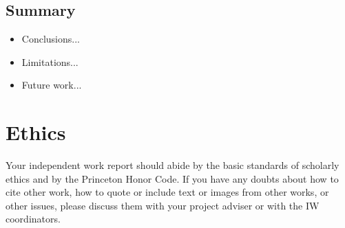 \documentclass[pageno]{jpaper}
\begin{document}
\subsection{Summary}
\begin{itemize}
\item Conclusions...
\item Limitations...
\item Future work...
\end{itemize}


\section{Ethics}

Your independent work report should abide by the basic standards of scholarly ethics and by the Princeton Honor Code. If you have any doubts about how to cite
other work, how to quote or include text or images from other works, or other issues, please discuss them with your project adviser or with the IW coordinators. 





\end{document}
